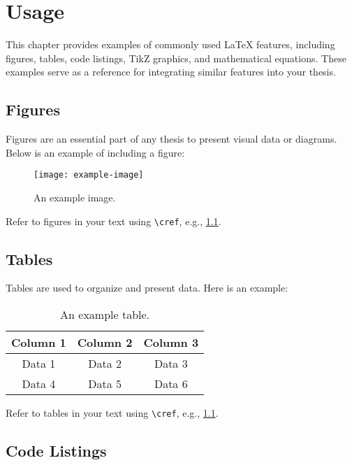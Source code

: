 \chapter{Usage}

This chapter provides examples of commonly used LaTeX features, including figures, tables, code listings, TikZ graphics, and mathematical equations. These examples serve as a reference for integrating similar features into your thesis.

\section{Figures}

Figures are an essential part of any thesis to present visual data or diagrams. Below is an example of including a figure:

\begin{figure}[h!]
    \centering
    \texttt{[image: example-image]}
    \caption{An example image.}
    \label{fig:example}
\end{figure}

Refer to figures in your text using \texttt{\textbackslash cref}, e.g., \cref{fig:example}.

\section{Tables}

Tables are used to organize and present data. Here is an example:

\begin{table}[h!]
    \centering
    \begin{tabular}{|c|c|c|}
        \hline
        Column 1 & Column 2 & Column 3 \\
        \hline
        Data 1   & Data 2   & Data 3   \\
        Data 4   & Data 5   & Data 6   \\
        \hline
    \end{tabular}
    \caption{An example table.}
    \label{tab:example}
\end{table}

Refer to tables in your text using \texttt{\textbackslash cref}, e.g., \cref{tab:example}.

\section{Code Listings}

